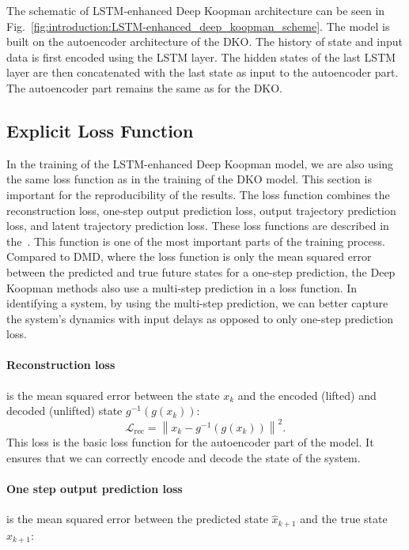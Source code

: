 \documentclass[conference]{IEEEtran}
\begin{document}
The schematic of LSTM-enhanced Deep Koopman architecture can be seen in Fig.~\ref{fig:introduction:LSTM-enhanced_deep_koopman_scheme}. The model is built on the autoencoder architecture of the DKO\@. The history of state and input data is first encoded using the LSTM layer. The hidden states of the last LSTM layer are then concatenated with the last state as input to the autoencoder part. The autoencoder part remains the same as for the DKO\@.

\subsection{Explicit Loss Function}\label{subsec:methodology:explicit_loss}
In the training of the LSTM-enhanced Deep Koopman model, we are also using the same loss function as in the training of the DKO model.
This section is important for the reproducibility of the results.
The loss function combines the reconstruction loss, one-step output prediction loss, output trajectory prediction loss, and latent trajectory prediction loss. These loss functions are described in the~\cite{lusch2018deep}. This function is one of the most important parts of the training process. Compared to DMD, where the loss function is only the mean squared error between the predicted and true future states for a one-step prediction, the Deep Koopman methods also use a multi-step prediction in a loss function. In identifying a system, by using the multi-step prediction, we can better capture the system's dynamics with input delays as opposed to only one-step prediction loss.

\paragraph*{Reconstruction loss}
is the mean squared error between the state \(x_k\) and the encoded (lifted) and decoded (unlifted) state \(g^{-1}(g(x_k))\):
\begin{equation}
    \mathcal{L}_{\text{rec}} = \left \|x_k - g^{-1}(g(x_k))\right \|^2.
\end{equation}
This loss is the basic loss function for the autoencoder part of the model. It ensures that we can correctly encode and decode the state of the system.

\paragraph*{One step output prediction loss}
is the mean squared error between the predicted state \(\hat{x}_{k+1}\) and the true state \(x_{k+1}\):
\end{document}
